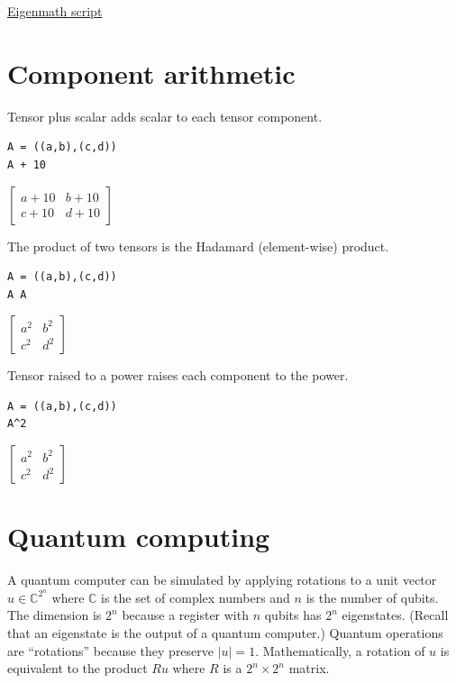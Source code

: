 \documentclass[12pt]{article}
\begin{document}
\href{https://georgeweigt.github.io/examples/linear-regression-demo.html}{Eigenmath script}

\newpage

\section{Component arithmetic}

Tensor plus scalar adds scalar to each tensor component.

{\color{blue}
\begin{verbatim}
A = ((a,b),(c,d))
A + 10
\end{verbatim}}

$\displaystyle
\begin{bmatrix}
a+10 & b+10
\\[1ex]
c+10 & d+10
\end{bmatrix}
$

\bigskip
The product of two tensors is the Hadamard (element-wise) product.

{\color{blue}
\begin{verbatim}
A = ((a,b),(c,d))
A A
\end{verbatim}}

$\displaystyle
\begin{bmatrix}
a^2 & b^2
\\[1ex]
c^2 & d^2
\end{bmatrix}
$

\bigskip

Tensor raised to a power raises each component to the power.

{\color{blue}
\begin{verbatim}
A = ((a,b),(c,d))
A^2
\end{verbatim}}

$\displaystyle
\begin{bmatrix}
a^2 & b^2
\\[1ex]
c^2 & d^2
\end{bmatrix}
$

\newpage

\section{Quantum computing}

A quantum computer can be simulated by applying rotations to a
unit vector
$u\in\mathbb{C}^{2^n}$ where $\mathbb{C}$ is the set of complex numbers
and $n$ is the number of qubits.
The dimension is $2^n$ because a register with $n$ qubits
has $2^n$ eigenstates.
(Recall that an eigenstate is the output of a quantum computer.)
Quantum operations are ``rotations'' because they preserve $|u|=1$.
Mathematically, a rotation of $u$ is equivalent to the product $Ru$
where $R$ is a $2^n\times2^n$ matrix.
\end{document}
